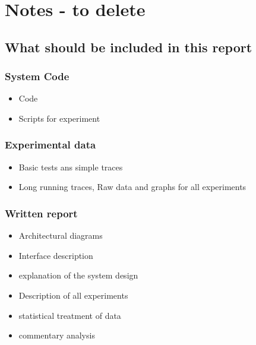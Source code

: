\documentclass[a4paper]{article}
\begin{document}
\section{Notes - to delete}


\subsection{What should be included in this report }

\subsubsection{System Code}
\begin{itemize}
\item Code
\item Scripts for experiment
\end{itemize}

\subsubsection{Experimental data}
\begin{itemize}
\item Basic tests ans simple traces
\item Long running traces, Raw data and graphs for all experiments
\end{itemize}

\subsubsection{Written report}
\begin{itemize}
\item Architectural  diagrams
\item Interface description
\item explanation of the system design
\item Description of all experiments
\item statistical treatment of data
\item commentary analysis
\end{itemize}
\end{document}
